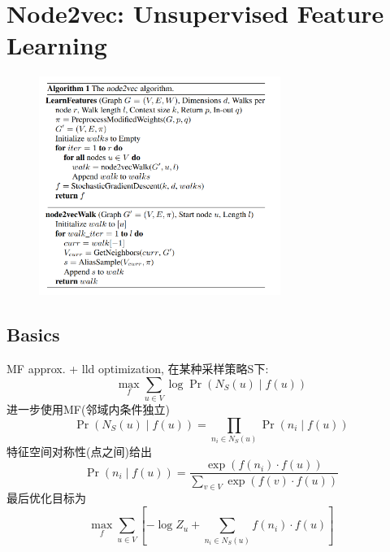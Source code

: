 \documentclass{article}
\begin{document}
\section{Node2vec: Unsupervised Feature Learning}
\begin{figure}[htbp]
    \centering
    \includegraphics[width=0.7\textwidth]{node2vec-alg.png}
\end{figure}

\subsection{Basics}
\begin{flushleft}
    MF approx. + lld optimization, 在某种采样策略S下:
    \begin{equation}
        \max _{f} \sum_{u \in V} \log \operatorname{Pr}\left(N_{S}(u) \mid f(u)\right)
    \end{equation}
    进一步使用MF(邻域内条件独立)
    \begin{equation}
        \operatorname{Pr}\left(N_{S}(u) \mid f(u)\right)=\prod_{n_{i} \in N_{S}(u)} \operatorname{Pr}\left(n_{i} \mid f(u)\right)
    \end{equation}
    特征空间对称性(点之间)给出
    \begin{equation}
        \operatorname{Pr}\left(n_{i} \mid f(u)\right)=\frac{\exp \left(f\left(n_{i}\right) \cdot f(u)\right)}{\sum_{v \in V} \exp (f(v) \cdot f(u))}
    \end{equation}
    最后优化目标为
    \begin{equation}
        \max _{f} \sum_{u \in V}\left[-\log Z_{u}+\sum_{n_{i} \in N_{S}(u)} f\left(n_{i}\right) \cdot f(u)\right]
    \end{equation}
\end{flushleft}
\end{document}
